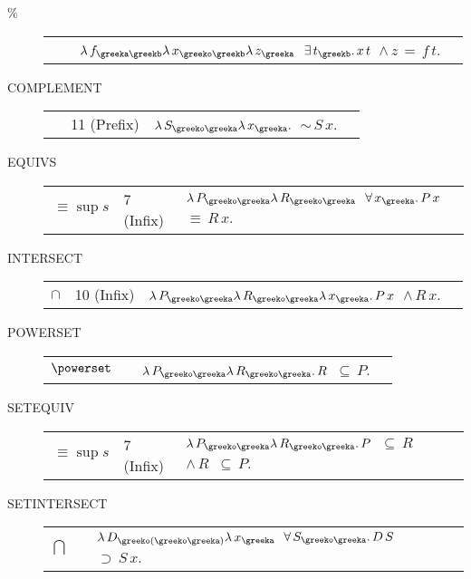 \begin{description} 
\item[\% ] \index{\% } \begin{tabular}{l l l l}
&&\texttt{$ \lambda \,f_{\greeka\greekb} \lambda \,x_{\greeko\greekb} \lambda \,z_{\greeka} $ $\exists \,t_{\greekb} . \,x \,t $ $\land \,z \,= \,f \,t$}. \\ 
\end{tabular}

\item[COMPLEMENT]  \begin{tabular}{l l l l}
\texttt{$\,~$}&11 (Prefix)&\texttt{$ \lambda \,S_{\greeko\greeka} \lambda \,x_{\greeka} . $ $\sim \,S \,x$}. \\ 
\end{tabular}

\item[EQUIVS]  \begin{tabular}{l l l l}
\texttt{$\,\equiv\sup s$}&7 (Infix)&\texttt{$ \lambda \,P_{\greeko\greeka} \lambda \,R_{\greeko\greeka} $ $\forall \,x_{\greeka} . \,P \,x $ $\equiv \,R \,x$}. \\ 
\end{tabular}

\item[INTERSECT]  \begin{tabular}{l l l l}
\texttt{$\cap$}&10 (Infix)&\texttt{$ \lambda \,P_{\greeko\greeka} \lambda \,R_{\greeko\greeka} \lambda \,x_{\greeka} . \,P \,x $ $\land \,R \,x$}. \\ 
\end{tabular}

\item[POWERSET]  \begin{tabular}{l l l l}
\texttt{$\powerset$}&&\texttt{$ \lambda \,P_{\greeko\greeka} \lambda \,R_{\greeko\greeka} . \,R $ $\subseteq \,P$}. \\ 
\end{tabular}

\item[SETEQUIV]  \begin{tabular}{l l l l}
\texttt{$\,\equiv\sup s$}&7 (Infix)&\texttt{$ \lambda \,P_{\greeko\greeka} \lambda \,R_{\greeko\greeka} . \,P $ $\subseteq \,R $ $\land \,R $ $\subseteq \,P$}. \\ 
\end{tabular}

\item[SETINTERSECT]  \begin{tabular}{l l l l}
\texttt{$\bigcap$}&&\texttt{$ \lambda \,D_{\greeko(\greeko\greeka)} \lambda \,x_{\greeka} $ $\forall \,S_{\greeko\greeka} . \,D \,S $ $\supset \,S \,x$}. \\ 
\end{tabular}


\end{description}
